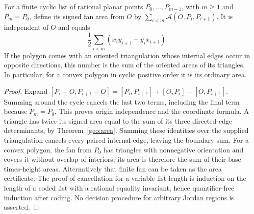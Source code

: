 \begin{theorem}
\label{geo:shoelace}
For a finite cyclic list of rational planar points
$P_0,\ldots,P_{m-1}$, with $m\ge1$ and $P_m=P_0$, define its signed fan area from $O$ by
$\sum_{i<m}\mathcal A(O,P_i,P_{i+1})$. It is independent of $O$ and equals
\[
 \frac12\sum_{i<m}(x_iy_{i+1}-y_ix_{i+1}).
\]
If the polygon comes with an oriented triangulation whose internal edges
occur in opposite directions, this number is the sum of the oriented areas
of its triangles. In particular, for a convex polygon in cyclic positive
order it is its ordinary area.
\end{theorem}
\begin{proof}
Expand
$[P_i-O,P_{i+1}-O]=[P_i,P_{i+1}]+[O,P_i]-[O,P_{i+1}]$.
Summing around the cycle cancels the last two terms, including the final
term because $P_m=P_0$. This proves origin independence and the coordinate
formula. A triangle has twice its signed area equal to the sum of its three
directed-edge determinants, by Theorem~\ref{geo:area}. Summing these
identities over the supplied triangulation cancels every paired internal
edge, leaving the boundary sum. For a convex polygon, the fan from $P_0$
has triangles with nonnegative orientation and covers it without overlap
of interiors; its area is therefore the sum of their base-times-height
areas. Alternatively that finite fan can be taken as the area certificate.
The proof of cancellation for a variable list length is induction on the
length of a coded list with a rational equality invariant, hence quantifier-free
induction after coding. No decision procedure for arbitrary Jordan regions
is asserted.
\end{proof}

